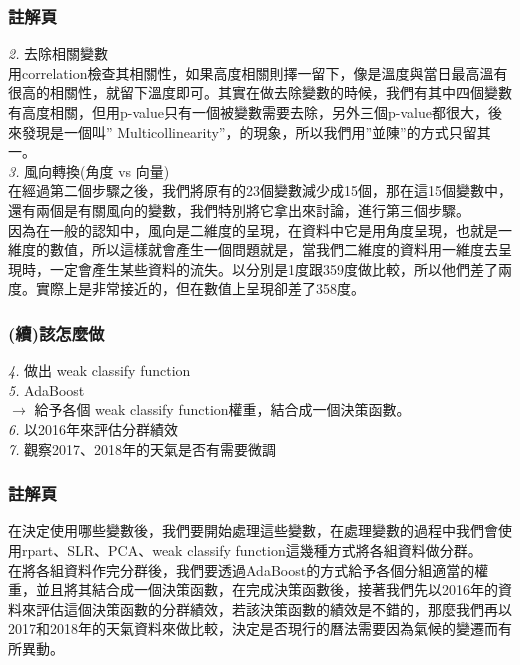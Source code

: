 \documentclass{beamer}
\begin{document}
\begin{frame}
\frametitle{註解頁}
\emph{2. }去除相關變數\\
\hspace*{4mm} 用correlation檢查其相關性，如果高度相關則擇一留下，像是溫度與當日最高溫有很高的相關性，就留下溫度即可。其實在做去除變數的時候，我們有其中四個變數有高度相關，但用p-value只有一個被變數需要去除，另外三個p-value都很大，後來發現是一個叫” Multicollinearity”，的現象，所以我們用”並陳”的方式只留其一。\\
\emph{3. }風向轉換(角度 vs 向量)\\
\hspace*{4mm} 在經過第二個步驟之後，我們將原有的23個變數減少成15個，那在這15個變數中，還有兩個是有關風向的變數，我們特別將它拿出來討論，進行第三個步驟。\\
\hspace*{4mm} 因為在一般的認知中，風向是二維度的呈現，在資料中它是用角度呈現，也就是一維度的數值，所以這樣就會產生一個問題就是，當我們二維度的資料用一維度去呈現時，一定會產生某些資料的流失。以分別是1度跟359度做比較，所以他們差了兩度。實際上是非常接近的，但在數值上呈現卻差了358度。


\end{frame}

\begin{frame}
\frametitle{(續)該怎麼做}
\emph{4. }做出 weak classify function\\
\emph{5. }AdaBoost\\
$\rightarrow$ 給予各個 weak classify function權重，結合成一個決策函數。\\
\emph{6. }以2016年來評估分群績效\\
\emph{7. }觀察2017、2018年的天氣是否有需要微調\\
\end{frame}
\begin{frame}
\frametitle{註解頁}
\hspace*{4mm} 在決定使用哪些變數後，我們要開始處理這些變數，在處理變數的過程中我們會使用rpart、SLR、PCA、weak classify function這幾種方式將各組資料做分群。\\
\hspace*{4mm} 在將各組資料作完分群後，我們要透過AdaBoost的方式給予各個分組適當的權重，並且將其結合成一個決策函數，在完成決策函數後，接著我們先以2016年的資料來評估這個決策函數的分群績效，若該決策函數的績效是不錯的，那麼我們再以2017和2018年的天氣資料來做比較，決定是否現行的曆法需要因為氣候的變遷而有所異動。\\
\end{frame}
\end{document}
